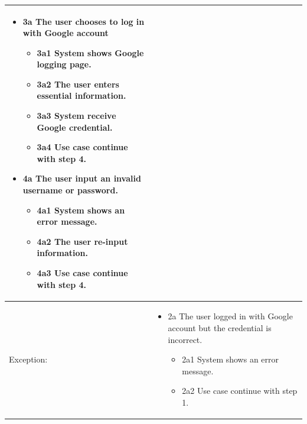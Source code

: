 \begin{table}[]
\begin{tabular}{| m{4cm} | m{11cm} |}
\begin{itemize}
    \item {3a The user chooses to log in with Google account}
    \begin{itemize}
        \item 3a1 System shows Google logging page.
        \item 3a2 The user enters essential information.
        \item 3a3 System receive Google credential.
        \item 3a4 Use case continue with step 4.
    \end{itemize}
    \item {4a The user input an invalid username or password.}
    \begin{itemize}
        \item 4a1 System shows an error message.
        \item 4a2 The user re-input information.
        \item 4a3 Use case continue with step 4.
    \end{itemize}
\end{itemize} \\ \hline
Exception: & \begin{itemize}
    \item {2a The user logged in with Google account but the credential is incorrect.}
    \begin{itemize}
        \item 2a1 System shows an error message.
        \item 2a2 Use case continue with step 1.
    \end{itemize}
\end{itemize} \\ \hline
\end{tabular}
\end{table}

